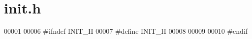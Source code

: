 \hypertarget{init_8h_source}{}\section{init.\+h}
\label{init_8h_source}

\begin{DoxyCode}
00001 
00006 \textcolor{preprocessor}{#ifndef INIT\_H}
00007 \textcolor{preprocessor}{#define INIT\_H}
00008 
00009 
00010 \textcolor{preprocessor}{#endif}
\end{DoxyCode}
